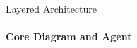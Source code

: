 \begin{frame}{Layered Architecture}
    \framesubtitle{Core Diagram and Agent}

        \centering
        
        \label{fig:agent-diagram}
\end{frame}
